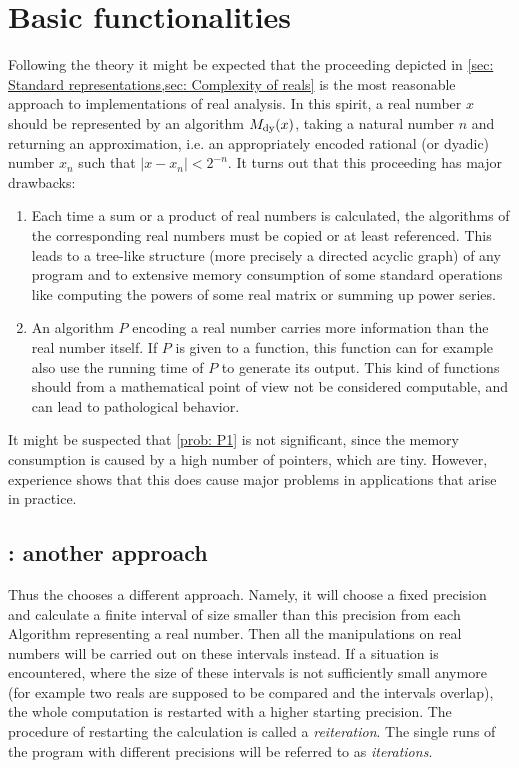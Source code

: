 \section{Basic functionalities}

Following the theory it might be expected that the proceeding depicted in \cref{sec: Standard representations,sec: Complexity of reals} is the most reasonable approach to implementations of real analysis. In this spirit, a real number $x$ should be represented by an algorithm $M_{\mathrm{dy}}(x)$, taking a natural number $n$ and returning an approximation, i.e. an appropriately encoded rational (or dyadic) number $x_n$ such that $|x-x_n|<2^{-n}$. It turns out that this proceeding has major drawbacks:
\begin{enumerate}
\item[\bf{\namedlabel{prob: P1}{(P1)}}] Each time a sum or a product of real numbers is calculated, the algorithms of the corresponding real numbers must be copied or at least referenced. This leads to a tree-like structure (more precisely a directed acyclic graph) of any program and to extensive memory consumption of some standard operations like computing the powers of some real matrix or summing up power series.
\item[\bf{\namedlabel{prob: P2}{(P2)}}] An algorithm $P$ encoding a real number carries more information than the real number itself. If $P$ is given to a function, this function can for example also use the running time of $P$ to generate its output. This kind of functions should from a mathematical point of view not be considered computable, and can lead to pathological behavior.
\end{enumerate}

It might be suspected that \ref{prob: P1} is not significant, since the memory consumption is caused by a high number of pointers, which are tiny. However, experience shows that this does cause major problems in applications that arise in practice.

\subsection{\irram: another approach}

Thus the \irram chooses a different approach. Namely, it will choose a fixed precision and calculate a finite interval of size smaller than this precision from each Algorithm representing a real number. Then all the manipulations on real numbers will be carried out on these intervals instead. If a situation is encountered, where the size of these intervals is not sufficiently small anymore (for example two reals are supposed to be compared and the intervals overlap), the whole computation is restarted with a higher starting precision. The procedure of restarting the calculation is called a \emph{reiteration}. The single runs of the program with different precisions will be referred to as \emph{iterations}.

